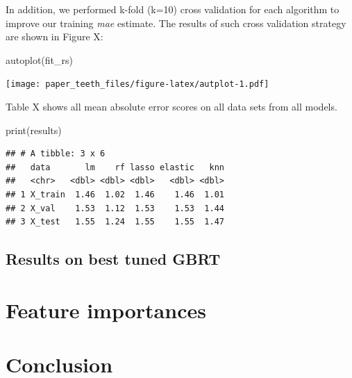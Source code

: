 \documentclass[11pt,]{article}
\newenvironment{Shaded}{\begin{snugshade}}{\end{snugshade}}
\newcommand{\FunctionTok}[1]{\textcolor[rgb]{0.00,0.00,0.00}{#1}}
\newcommand{\NormalTok}[1]{#1}
\begin{document}
In addition, we performed k-fold (k=10) cross validation for each
algorithm to improve our training \emph{mae} estimate. The results of
such cross validation strategy are shown in Figure X:

\begin{Shaded}
\begin{Highlighting}[]
\FunctionTok{autoplot}\NormalTok{(fit\_rs)}
\end{Highlighting}
\end{Shaded}

\texttt{[image: paper\_teeth\_files/figure-latex/autplot-1.pdf]}

Table X shows all mean absolute error scores on all data sets from all
models.

\begin{Shaded}
\begin{Highlighting}[]
\FunctionTok{print}\NormalTok{(results)}
\end{Highlighting}
\end{Shaded}

\begin{verbatim}
## # A tibble: 3 x 6
##   data       lm    rf lasso elastic   knn
##   <chr>   <dbl> <dbl> <dbl>   <dbl> <dbl>
## 1 X_train  1.46  1.02  1.46    1.46  1.01
## 2 X_val    1.53  1.12  1.53    1.53  1.44
## 3 X_test   1.55  1.24  1.55    1.55  1.47
\end{verbatim}

\hypertarget{results-on-best-tuned-gbrt}{%
\subsection{Results on best tuned
GBRT}\label{results-on-best-tuned-gbrt}}

\hypertarget{feature-importances}{%
\section{Feature importances}\label{feature-importances}}

\hypertarget{conclusion}{%
\section{Conclusion}\label{conclusion}}





\newpage
\singlespacing 
\printbibliography[title=References]
\end{document}
